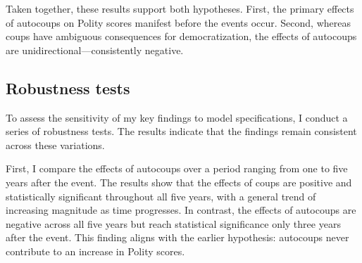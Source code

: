 \documentclass[
  12pt,
]{report}
\begin{document}
Taken together, these results support both hypotheses. First, the
primary effects of autocoups on Polity scores manifest before the events
occur. Second, whereas coups have ambiguous consequences for
democratization, the effects of autocoups are
unidirectional---consistently negative.

\subsection{Robustness tests}\label{robustness-tests}

To assess the sensitivity of my key findings to model specifications, I
conduct a series of robustness tests. The results indicate that the
findings remain consistent across these variations.

First, I compare the effects of autocoups over a period ranging from one
to five years after the event. The results show that the effects of
coups are positive and statistically significant throughout all five
years, with a general trend of increasing magnitude as time progresses.
In contrast, the effects of autocoups are negative across all five years
but reach statistical significance only three years after the event.
This finding aligns with the earlier hypothesis: autocoups never
contribute to an increase in Polity scores.
\end{document}

